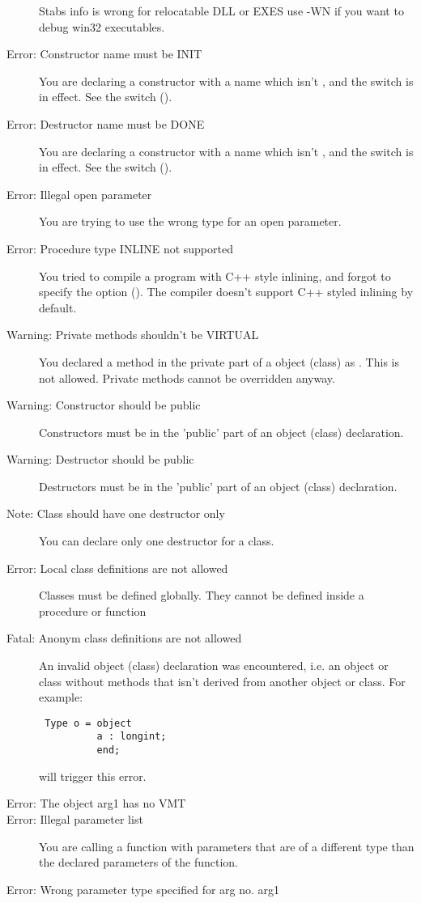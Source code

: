 \begin{description}
 Stabs info is wrong for relocatable DLL or EXES use -WN
 if you want to debug win32 executables.
\item [Error: Constructor name must be INIT]
 You are declaring a constructor with a name which isn't , and the
  switch is in effect. See the  switch ().
\item [Error: Destructor name must be DONE]
 You are declaring a constructor with a name which isn't , and the
  switch is in effect. See the  switch ().
\item [Error: Illegal open parameter]
 You are trying to use the wrong type for an open parameter.
\item [Error: Procedure type INLINE not supported]
 You tried to compile a program with C++ style inlining, and forgot to
 specify the  option (). The compiler doesn't support C++
 styled inlining by default.
\item [Warning: Private methods shouldn't be VIRTUAL]
 You declared a method in the private part of a object (class) as
 . This is not allowed. Private methods cannot be overridden
 anyway.
\item [Warning: Constructor should be public]
 Constructors must be in the 'public' part of an object (class) declaration.
\item [Warning: Destructor should be public]
 Destructors must be in the 'public' part of an object (class) declaration.
\item [Note: Class should have one destructor only]
 You can declare only one destructor for a class.
\item [Error: Local class definitions are not allowed]
 Classes must be defined globally. They cannot be defined inside a
 procedure or function
\item [Fatal: Anonym class definitions are not allowed]
 An invalid object (class) declaration was encountered, i.e. an
 object or class without methods that isn't derived from another object or
 class. For example:
 \begin{verbatim}
 Type o = object
          a : longint;
          end;
 \end{verbatim}
 will trigger this error.
\item [Error: The object arg1 has no VMT]
\item [Error: Illegal parameter list]
 You are calling a function with parameters that are of a different type than
 the declared parameters of the function.
\item [Error: Wrong parameter type specified for arg no. arg1]

\end{description}
